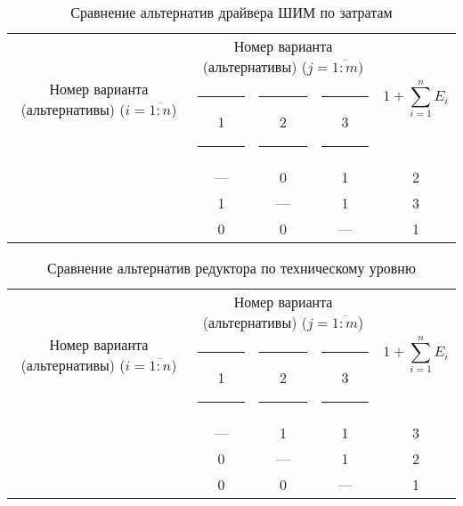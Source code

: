 \begin{table}[H]
    \centering
    \begin{tabular}{|c|c|c|c|c|}
        \hline
        \multirow{2}{2.4cm}[-0.5pc]{
            \centering
            Номер варианта (альтернативы) ($i = \overline{1:n}$)
        } &
        \multicolumn{3}{c|}{
            \parbox[t]{2.4cm}{
                \centering
                Номер варианта (альтернативы) ($j = \overline{1:m}$)
            }
        } &
        \multirow{2}{1.7cm}{
            \centering
            $$1 + \sum_{i=1}^n E_i$$
        } \\
        &
        \centering \rule{2pt}{0pt} 1 \rule{2pt}{0pt} &
        \centering \rule{2pt}{0pt} 2 \rule{2pt}{0pt} &
        \centering \rule{2pt}{0pt} 3 \rule{2pt}{0pt} & \\
        \hline \hline
        \centering{1} &---& 0 & 1 & 2 \\ \hline
        \centering{2} & 1 &---& 1 & 3 \\ \hline
        \centering{3} & 0 & 0 &---& 1 \\ \hline
    \end{tabular}
    \caption{Сравнение альтернатив драйвера ШИМ по затратам}
    \label{tbl_drv_cost_lvl_comparison}
\end{table}

\begin{table}[H]
    \centering
    \begin{tabular}{|c|c|c|c|c|}
        \hline
        \multirow{2}{2.4cm}[-0.5pc]{
            \centering
            Номер варианта (альтернативы) ($i = \overline{1:n}$)
        } &
        \multicolumn{3}{c|}{
            \parbox[t]{2.4cm}{
                \centering
                Номер варианта (альтернативы) ($j = \overline{1:m}$)
            }
        } &
        \multirow{2}{1.7cm}{
            \centering
            $$1 + \sum_{i=1}^n E_i$$
        } \\
        &
        \centering \rule{2pt}{0pt} 1 \rule{2pt}{0pt} &
        \centering \rule{2pt}{0pt} 2 \rule{2pt}{0pt} &
        \centering \rule{2pt}{0pt} 3 \rule{2pt}{0pt} & \\
        \hline \hline
        \centering{1} &---& 1 & 1 & 3 \\ \hline
        \centering{2} & 0 &---& 1 & 2 \\ \hline
        \centering{3} & 0 & 0 &---& 1 \\ \hline
    \end{tabular}
    \caption{Сравнение альтернатив редуктора по техническому уровню}
    \label{tbl_red_tech_lvl_comparison}
\end{table}


